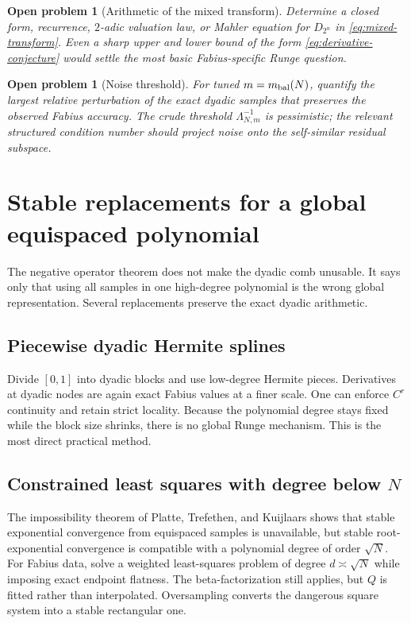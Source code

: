 \documentclass[11pt,oneside]{article}
\numberwithin{equation}{section}
\newtheorem{problem}[theorem]{Open problem}
\theoremstyle{definition}
\theoremstyle{remark}
\newcommand{\Leb}{\Lambda}
\begin{document}
\begin{problem}[Arithmetic of the mixed transform]
Determine a closed form, recurrence, $2$-adic valuation law, or Mahler equation for
$D_{2^n}$ in \eqref{eq:mixed-transform}.  Even a sharp upper and lower bound of the form
\eqref{eq:derivative-conjecture} would settle the most basic Fabius-specific Runge question.
\end{problem}

\begin{problem}[Noise threshold]
For tuned $m=m_{\rm bal}(N)$, quantify the largest relative perturbation of the exact dyadic
samples that preserves the observed Fabius accuracy.  The crude threshold
$\Leb_{N,m}^{-1}$ is pessimistic; the relevant structured condition number should project
noise onto the self-similar residual subspace.
\end{problem}

\section{Stable replacements for a global equispaced polynomial}
\label{sec:alternatives}

The negative operator theorem does not make the dyadic comb unusable.  It says only that
using all samples in one high-degree polynomial is the wrong global representation.
Several replacements preserve the exact dyadic arithmetic.

\subsection{Piecewise dyadic Hermite splines}

Divide $[0,1]$ into dyadic blocks and use low-degree Hermite pieces.  Derivatives at dyadic
nodes are again exact Fabius values at a finer scale.  One can enforce $C^r$ continuity and
retain strict locality.  Because the polynomial degree stays fixed while the block size
shrinks, there is no global Runge mechanism.  This is the most direct practical method.

\subsection{Constrained least squares with degree below $N$}

The impossibility theorem of Platte, Trefethen, and Kuijlaars shows that stable exponential
convergence from equispaced samples is unavailable, but stable root-exponential convergence
is compatible with a polynomial degree of order $\sqrt N$.  For Fabius data, solve a
weighted least-squares problem of degree $d\asymp\sqrt N$ while imposing exact endpoint
flatness.  The beta-factorization still applies, but $Q$ is fitted rather than interpolated.
Oversampling converts the dangerous square system into a stable rectangular one.
\end{document}
